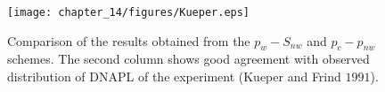 \begin{figure}[!htb]
\begin{center}
\texttt{[image: chapter\_14/figures/Kueper.eps]}
\end{center}
\caption{Comparison of the results obtained from the $p_w-S_{nw}$ and $p_c-p_{nw}$ schemes. The second column shows good agreement with observed distribution of DNAPL of the experiment (Kueper and Frind $1991$).}
\label{mcwt:keuperresults}
\end{figure}